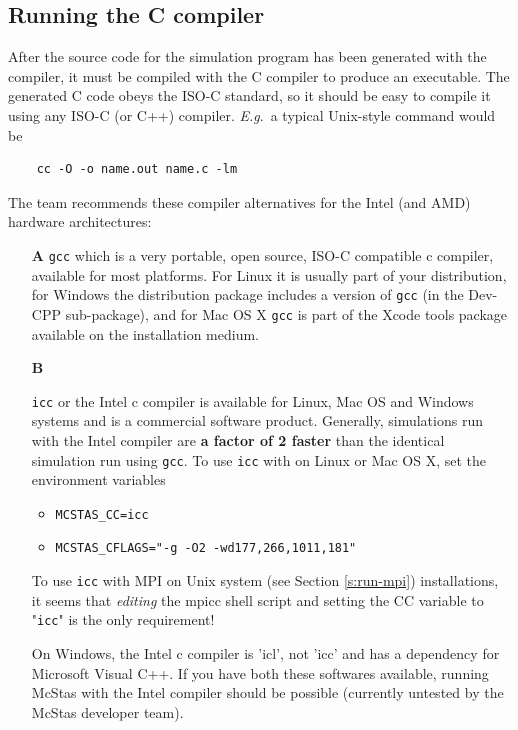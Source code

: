 \subsection{Running the C compiler}
\label{s:compile}

After the source code for the simulation program has been generated with the
\MCS compiler, it must be compiled with the C compiler to produce an
executable. The generated C code obeys the ISO-C standard, so it should be easy
to compile it using any ISO-C (or C++) compiler. \textit{E.g}.\ a typical
Unix-style command would be
\begin{lstlisting}
    cc -O -o name.out name.c -lm
\end{lstlisting}
The \MCS team recommends these compiler alternatives for the Intel (and AMD)
hardware architectures:
\begin{itemize}
\item[\textbf{A}]{\verb+gcc+ which is a very portable, open source, ISO-C compatible
    c compiler, available for most platforms. For Linux it is usually part of
    your distribution, for Windows the \MCS distribution package includes a
    version of \verb+gcc+ (in the Dev-CPP sub-package), and for Mac OS X
    \verb+gcc+ is part of the Xcode tools package available on the installation
    medium.}
\item[\textbf{B}]{\verb+icc+ or the Intel c compiler is available for Linux, Mac OS
    and Windows systems and is a commercial software product. Generally,
    simulations run with the Intel compiler are \textbf{a factor of 2 faster} than
    the identical simulation run using \verb+gcc+. To use \verb+icc+ with \MCS
    on Linux or Mac OS X, set the environment variables
    \begin{itemize}
      \item{\verb+MCSTAS_CC=icc+}
      \item{\verb+MCSTAS_CFLAGS="-g -O2 -wd177,266,1011,181"+}
    \end{itemize}
    To use \verb+icc+ with MPI on Unix system (see Section \ref{s:run-mpi})
 installations, it seems that \emph{editing}
    the mpicc shell script and setting the CC variable to "\verb+icc+" is the
    only requirement!}
  On Windows, the Intel c compiler is 'icl', not 'icc' and has a dependency for
  Microsoft Visual C++. If you have both these softwares available, running
  McStas with the Intel compiler should be possible (currently untested by the
  McStas developer team).

\end{itemize}


